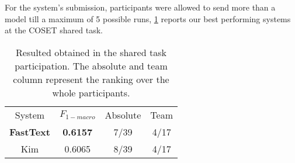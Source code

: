For the system's submission, participants were allowed to send more than a model till a maximum of 5 possible runs, \cref{tab:results} reports our best performing systems at the COSET shared task.

\begin{comment}
\begin{table}[h]
\footnotesize
\caption{Resulted obtained in the shared task participation. The absolute and team column represent the ranking over the whole participants.}
\label{tab:resultsOLD}
\centering
\begin{tabular}{c|c|c|c}
\toprule
\hline
System		& $F_{1-macro}$		& Absolute	& Team	\\
\hline
\textbf{FastText}	& \textbf{0.6157}	& 7/39	& 4/17 \\
Kim			& 0.6065	& 8/39	& 4/17\\
\hline
\bottomrule
\end{tabular}
\end{table}
\end{comment}

\begin{table}[h]
	\centering
	\caption{Resulted obtained in the shared task participation. The absolute and team column represent the ranking over the whole participants.}
	\label{tab:results}
	\begin{tabular}{c|c|c|c}
		\hline\noalign{\smallskip}
		System		& $F_{1-macro}$		& Absolute	& Team	\\
		\noalign{\smallskip}
		\hline
		\noalign{\smallskip}
		\textbf{FastText}	& \textbf{0.6157}	& 7/39	& 4/17 \\
		Kim			& 0.6065	& 8/39	& 4/17\\
		\hline
	\end{tabular}
\end{table}